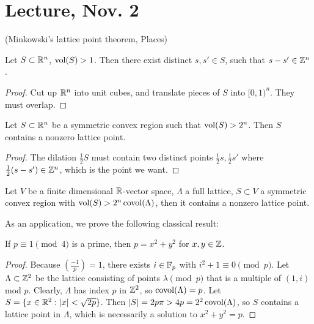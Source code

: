 \documentclass[11pt]{amsart}
\begin{document}
\section{Lecture, Nov. 2}

(Minkowski's lattice point theorem, Places)

\begin{lem}
Let $S\subset \mathbb{R}^n$, $\operatorname{vol}(S) > 1$. Then there exist distinct $s,s'\in S$, such that $s-s'\in \mathbb{Z}^n$.
\end{lem}

\begin{proof}
Cut up $\mathbb{R}^n$ into unit cubes, and translate pieces of $S$ into $[0,1)^n$. They must overlap.
\end{proof}

\begin{thm}
Let $S\subset \mathbb{R}^n$ be a symmetric convex region such that $\operatorname{vol}(S) > 2^n$. Then $S$ contains a nonzero lattice point.
\end{thm}

\begin{proof}
The dilation $\frac12 S$ must contain two distinct points $\frac12 s,\frac12 s'$ where $\frac12(s-s')\in \mathbb{Z}^n$, which is the point we want.
\end{proof}

\begin{thm}
Let $V$ be a finite dimensional $\mathbb{R}$-vector space, $\Lambda$ a full lattice, $S\subset V$ a symmetric convex region with $\operatorname{vol}(S) > 2^n\operatorname{covol}(\Lambda)$, then it contains a nonzero lattice point.
\end{thm}

As an application, we prove the following classical result:

\begin{thm}
If $p\equiv 1\pmod{4}$ is a prime, then $p=x^2 + y^2$ for $x,y\in \mathbb{Z}$.
\end{thm}

\begin{proof}
Because $(\frac{-1}{p})=1$, there exists $i\in \mathbb{F}_p$ with $i^2+1\equiv 0\pmod{p}$. Let $\Lambda\subset \mathbb{Z}^2$ be the lattice consisting of points $\lambda \pmod{p}$ that is a multiple of $(1,i)$ mod $p$. Clearly, $\Lambda$ has index $p$ in $\mathbb{Z}^2$, so $\operatorname{covol}(\Lambda) = p$. Let $S = \{x\in \mathbb{R}^2: |x| < \sqrt{2p}\}$. Then $|S| = 2p\pi > 4p = 2^2\operatorname{covol}(\Lambda)$, so $S$ contains a lattice point in $\Lambda$, which is necessarily a solution to $x^2+y^2=p$.
\end{proof}
\end{document}
